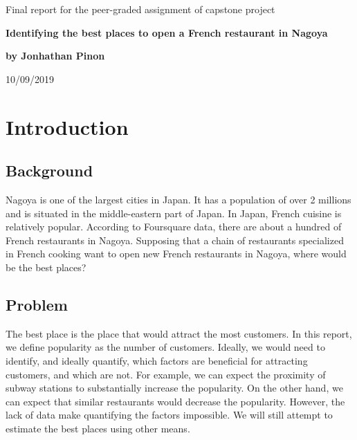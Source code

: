 \documentclass[12pt,a4paper]{article}
\begin{document}
%

\begin{titlepage}

\vspace{5 cm}

\begin{center}

\Huge Final report for the peer-graded assignment of capstone project

\vspace{3 cm}

\Huge \textbf{Identifying the best places to open a French restaurant in Nagoya}

\vspace{2 cm}

\Large \textbf{by Jonhathan Pinon} \\

\vspace{2 cm}


\large 10/09/2019


\end{center}

\end{titlepage}

\clearpage
\tableofcontents
{}

\listoffigures


\pagestyle{IHA-fancy-style}


\section{Introduction}

\subsection{Background}


Nagoya is one of the largest cities in Japan. It has a population of over 2 millions and is situated in the middle-eastern part of Japan. In Japan, French cuisine is relatively popular. According to Foursquare data, there are about a hundred of French restaurants in Nagoya. Supposing that a chain of restaurants specialized in French cooking want to open new French restaurants in Nagoya, where would be the best places? 

\subsection{Problem}

The best place is the place that would attract the most customers. In this report, we define popularity as the number of customers. Ideally, we would need to identify, and ideally quantify, which factors are beneficial for attracting customers, and which are not. For example, we can expect the proximity of subway stations to substantially increase the popularity. On the other hand, we can expect that similar restaurants would decrease the popularity. However, the lack of data make quantifying the factors impossible. We will still attempt to estimate the best places using other means.
\end{document}

